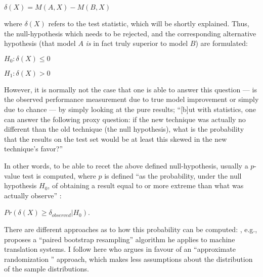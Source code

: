 $\delta(X) = M(A, X) - M(B, X)$

where $\delta(X)$ refers to the test statistic, which will be shortly explained.
Thus, the null-hypothesis which needs to be rejected, and the corresponding
alternative hypothesis (that model $A$ \emph{is} in fact truly superior to model
$B$) are formulated:

$H_0:\delta(X) \leq 0$

$H_1:\delta(X) > 0$

However, it is normally not the case that one is able to answer this question --- is the observed
performance measurement due to true model improvement or simply due to chance --- by simply looking
at the pure results; ``[b]ut with statistics, one can answer the following proxy question: if the
new technique was actually no different than the old technique (the null hypothesis), what is the
probability that the results on the test set would be at least this skewed in the new technique’s
favor?'' \citep{yeh2000more}

In other words, to be able to recet the above defined null-hypothesis, usually a $p$-value test is
computed, where $p$ is defined ``as the probability, under the null hypothesis $H_0$, of obtaining
a result equal to or more extreme than what was actually observe'' \citep[p.~1384]{dror2018hitchhiker}:

$Pr(\delta(X) \geq \delta_{observed} | H_0)$.

There are different approaches as to how this probability can
be computed: \citep{koehn2004statistical}, e.g., proposes a
``paired bootstrap resampling'' algorithm he applies to machine
translation systems. I follow here \cite{morgan2005statistical} who
argues in favour of an ``approximate randomization '' approach,
which makes less assumptions about the distribution of the sample
distributions.



